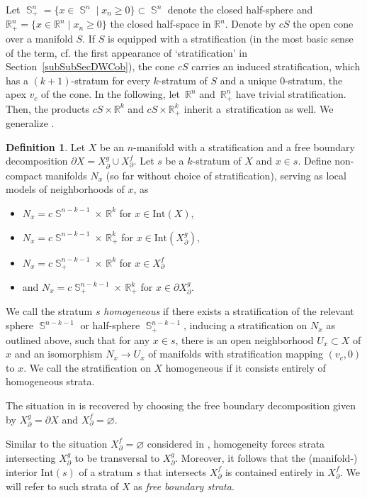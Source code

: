 \documentclass[pdftex]{sigma}
\DeclareMathOperator{\Sp}{\mathbb{S}}
\numberwithin{equation}{section}
\theoremstyle{definition}
\newtheorem{Definition}[Definition]{Definition}
\begin{document}
Let $\Sp_+^n = \{x \in \Sp^n\mid x_n \geq 0\} \subset \Sp^n$ denote the closed half-sphere and $\mathbb{R}_+^n = \{x \in \mathbb{R}^n \mid x_n \geq 0\}$ the closed half-space in $\mathbb{R}^n$. Denote by $cS$ the open cone over a manifold $S$. If $S$ is equipped with a stratification (in the most basic sense of the term, cf. the first appearance of `stratification' in Section~\ref{subSubSecDWCob}), the cone $cS$ carries an induced stratification, which has a $(k+1)$-stratum for every $k$-stratum of $S$ and a unique 0-stratum, the apex $v_c$ of the cone. In the following, let~$\mathbb{R}^n$ and~$ \mathbb{R}_+^n$ have trivial stratification. Then, the products $cS \times \mathbb{R}^k$ and $cS \times \mathbb{R}_+^k$ inherit a~stratification as well. We generalize \cite[Definition~3.7]{FMM}.
\begin{Definition}
 \label{defFBHomStr}
 Let $X$ be an $n$-manifold with a stratification and a free boundary decomposition $\partial X = X_{\partial}^g \cup X_{\partial}^f$. Let $s$ be a $k$-stratum of $X$ and $x \in s$. Define non-compact manifolds $N_x$ (so far without choice of stratification), serving as local models of neighborhoods of $x$, as
 \begin{itemize}\itemsep=0pt
 \item $N_x = c\Sp^{n-k-1} \times \, \mathbb{R}^k$ for $x \in \mathrm{Int}(X)$,
 \item $N_x = c\Sp^{n-k-1} \times \, \mathbb{R}_+^k$ for $x \in \mathrm{Int}(X_{\partial}^g)$,
 \item $N_x = c\Sp_+^{n-k-1} \times \, \mathbb{R}^k$ for $x \in X_{\partial}^f$
 \item and $N_x = c\Sp_+^{n-k-1} \times \, \mathbb{R}_+^k$ for $x \in \partial X_{\partial}^g$.
 \end{itemize}
 We call the stratum $s$ \textit{homogeneous} if there exists a stratification of the relevant sphere $\Sp^{n-k-1}$ or half-sphere $\Sp_+^{n-k-1}$, inducing a stratification on $N_x$ as outlined above, such that for any $x \in s$, there is an open neighborhood $U_x \subset X$ of $x$ and an isomorphism $N_x \rightarrow U_x$ of manifolds with stratification mapping $(v_c, 0)$ to $x$. We call the stratification on $X$ homogeneous if it consists entirely of homogeneous strata.
\end{Definition}
The situation in \cite{FMM} is recovered by choosing the free boundary decomposition given by $X_{\partial}^g = \partial X$ and $X_{\partial}^f = \varnothing$.

Similar to the situation $X_{\partial}^f = \varnothing$ considered in \cite{FMM}, homogeneity forces strata intersecting $X_{\partial}^g$ to be transversal to $X_{\partial}^g$. Moreover, it follows that the (manifold-) interior $\mathrm{Int}(s)$ of a stratum $s$ that intersects $X_{\partial}^f$ is contained entirely in $X_{\partial}^f$. We will refer to such strata of $X$ as \textit{free boundary strata}.
\end{document}
